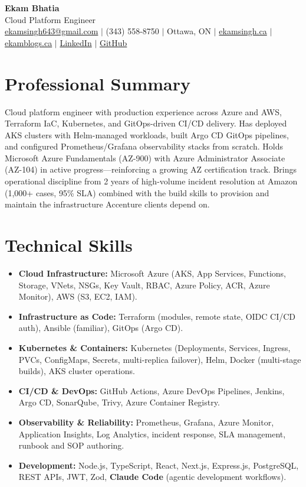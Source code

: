 \documentclass[11pt,a4paper]{article}
\begin{document}
\begin{center}
    {\LARGE \textbf{Ekam Bhatia}} \\
    \vspace{2pt}
    {\normalsize Cloud Platform Engineer} \\
    \vspace{4pt}
    \small
    \href{mailto:ekamsingh643@gmail.com}{ekamsingh643@gmail.com} $|$
    (343) 558-8750 $|$ Ottawa, ON $|$
    \href{https://www.ekamsingh.ca}{ekamsingh.ca} $|$
    \href{https://www.ekamblogs.ca}{ekamblogs.ca} $|$
    \href{https://www.linkedin.com/in/ekam-bhatia-335840168}{LinkedIn} $|$
    \href{https://github.com/bhat0155}{GitHub}
\end{center}

\section{Professional Summary}
Cloud platform engineer with production experience across Azure and AWS, Terraform IaC, Kubernetes, and GitOps-driven CI/CD delivery. Has deployed AKS clusters with Helm-managed workloads, built Argo CD GitOps pipelines, and configured Prometheus/Grafana observability stacks from scratch. Holds Microsoft Azure Fundamentals (AZ-900) with Azure Administrator Associate (AZ-104) in active progress---reinforcing a growing AZ certification track. Brings operational discipline from 2 years of high-volume incident resolution at Amazon (1,000+ cases, 95\% SLA) combined with the build skills to provision and maintain the infrastructure Accenture clients depend on.

\section{Technical Skills}
\begin{itemize}
    \item \textbf{Cloud Infrastructure:} Microsoft Azure (AKS, App Services, Functions, Storage, VNets, NSGs, Key Vault, RBAC, Azure Policy, ACR, Azure Monitor), AWS (S3, EC2, IAM).
    \item \textbf{Infrastructure as Code:} Terraform (modules, remote state, OIDC CI/CD auth), Ansible (familiar), GitOps (Argo CD).
    \item \textbf{Kubernetes \& Containers:} Kubernetes (Deployments, Services, Ingress, PVCs, ConfigMaps, Secrets, multi-replica failover), Helm, Docker (multi-stage builds), AKS cluster operations.
    \item \textbf{CI/CD \& DevOps:} GitHub Actions, Azure DevOps Pipelines, Jenkins, Argo CD, SonarQube, Trivy, Azure Container Registry.
    \item \textbf{Observability \& Reliability:} Prometheus, Grafana, Azure Monitor, Application Insights, Log Analytics, incident response, SLA management, runbook and SOP authoring.
    \item \textbf{Development:} Node.js, TypeScript, React, Next.js, Express.js, PostgreSQL, REST APIs, JWT, Zod, \textbf{Claude Code} (agentic development workflows).
\end{itemize}
\end{document}
